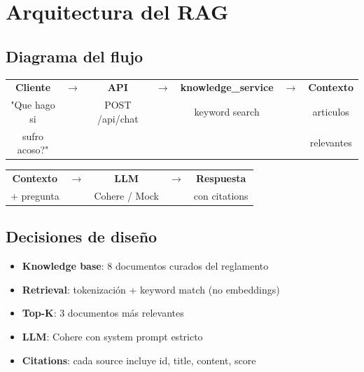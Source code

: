 \documentclass[11pt,a4paper,oneside]{article}
\newcommand{\ok}{\textcolor{okgreen}{\textbf{\checkmark}}}
\begin{document}
\section{Arquitectura del RAG}

\subsection{Diagrama del flujo}

\begin{center}
\begin{tabular}{ccccccc}
\textbf{Cliente} & $\rightarrow$ & \textbf{API} & $\rightarrow$ & \textbf{knowledge\_service} & $\rightarrow$ & \textbf{Contexto} \\
"Que hago si & & POST /api/chat & & keyword search & & articulos \\
sufro acoso?" & & & & & & relevantes \\
\end{tabular}
\end{center}

\begin{center}
\begin{tabular}{ccccc}
\textbf{Contexto} & $\rightarrow$ & \textbf{LLM} & $\rightarrow$ & \textbf{Respuesta} \\
+ pregunta & & Cohere / Mock & & con citations \\
\end{tabular}
\end{center}

\subsection{Decisiones de dise\~no}

\begin{itemize}
  \item \ok \textbf{Knowledge base}: 8 documentos curados del reglamento
  \item \ok \textbf{Retrieval}: tokenizaci\'on + keyword match (no embeddings)
  \item \ok \textbf{Top-K}: 3 documentos m\'as relevantes
  \item \ok \textbf{LLM}: Cohere con system prompt estricto
  \item \ok \textbf{Citations}: cada source incluye id, title, content, score
\end{itemize}
\end{document}
